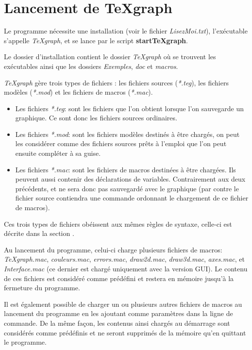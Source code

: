 \section{Lancement de TeXgraph}

Le programme nécessite une installation (voir le fichier \textit{LisezMoi.txt}), l'exécutable s'appelle \textit{TeXgraph}, et se lance par le script \textbf{startTeXgraph}.

Le dossier d'installation contient le dossier \textit{TeXgraph} où se trouvent les exécutables ainsi que les dossiers
\textit{Exemples}, \textit{doc} et \textit{macros}.

\textit{TeXgraph} gère trois types de fichiers : les fichiers sources (\textit{*.teg}), les fichiers modèles (\textit{*.mod}) et les fichiers de macros (\textit{*.mac}).

\begin{itemize}
 \item Les fichiers \textit{*.teg}: sont les fichiers que l'on obtient lorsque l'on sauvegarde un graphique. Ce sont donc les fichiers sources ordinaires.
 \item Les fichiers \textit{*.mod}: sont les fichiers modèles destinés à être chargés, on peut les considérer comme des fichiers sources prêts à l'emploi que l'on peut ensuite compléter à sa guise.
 \item Les fichiers \textit{*.mac}: sont les fichiers de macros destinées à être chargées. Ils peuvent aussi contenir des déclarations de variables. Contrairement aux deux précédents,  et ne sera donc pas sauvegardé avec le graphique (par contre le fichier source contiendra une commande ordonnant le chargement de ce fichier de macros).
 \end{itemize}
Ces trois types de fichiers obéissent aux mêmes règles de syntaxe, celle-ci est décrite dans la section .


Au lancement du programme, celui-ci charge plusieurs fichiers de macros: \textit{TeXgraph.mac}, \textit{couleurs.mac},
\textit{errors.mac}, \textit{draw2d.mac}, \textit{draw3d.mac}, \textit{axes.mac}, et \textit{Interface.mac} (ce dernier est chargé uniquement avec la version GUI). Le contenu de ces fichiers est considéré comme prédéfini et restera en mémoire jusqu'à la fermeture du programme.

Il est également possible de charger un ou plusieurs autres fichiers de macros au lancement du programme en les ajoutant
comme paramètres dans la ligne de commande. De la même façon, les contenus ainsi chargés au démarrage sont considérés
comme prédéfinis et ne seront supprimés de la mémoire qu'en quittant le programme.

